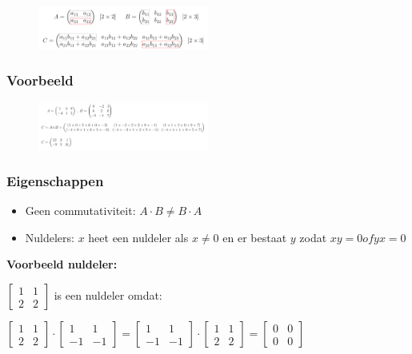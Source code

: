 \documentclass{article}
\begin{document}
\begin{figure}[H]
    \centering
    \includegraphics[width=0.5\textwidth]{matrix-vermenigvuldigen.png}
    \caption{}
\end{figure}


\subsubsection{Voorbeeld}

\begin{figure}[H]
    \centering
    \includegraphics[width=0.5\textwidth]{matrix-vermenigvuldigen-voorbeeld.png}
\end{figure}


\subsubsection{Eigenschappen}

\begin{itemize}
    \item Geen commutativiteit: $A \cdot B \neq B \cdot A$
    \item Nuldelers: $x$ heet een nuldeler als $x \neq 0$ en er bestaat $y$ zodat $xy = 0 of yx = 0$
\end{itemize}

\textbf{Voorbeeld nuldeler:}

$\begin{bmatrix}
1 & 1\\
2 & 2
\end{bmatrix}$ is een nuldeler omdat: 

$\begin{bmatrix}
    1 & 1\\
    2 & 2
\end{bmatrix} \cdot 
\begin{bmatrix}
    1 & 1\\
    -1 & -1
\end{bmatrix} = 
\begin{bmatrix}
    1 & 1\\
    -1 & -1
\end{bmatrix}
 \cdot 
\begin{bmatrix}
    1 & 1\\
    2 & 2
\end{bmatrix} =
\begin{bmatrix}
    0 & 0\\
    0 & 0
\end{bmatrix}$
\end{document}

